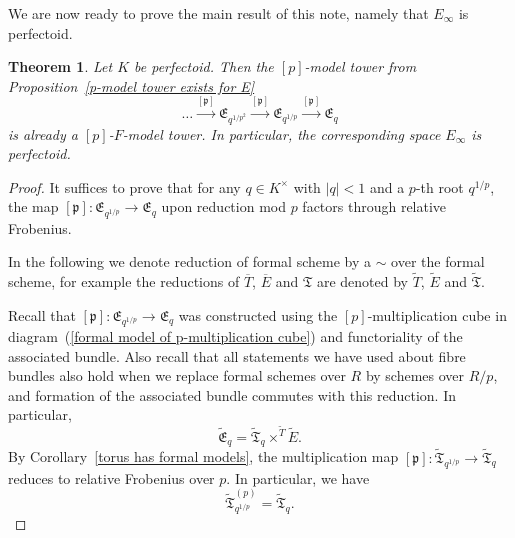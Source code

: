 \documentclass[11pt,oneside]{amsart}
\newtheorem{theorem}{Theorem}[section]
\theoremstyle{definition}
\theoremstyle{remark}
\begin{document}
	We are now ready to prove the main result of this note, namely that $E_\infty$ is perfectoid.
	\begin{framed}
	\begin{theorem}\label{p-F-model tower exists for E}
		Let $K$ be perfectoid. Then the $[p]$-model tower from Proposition~\ref{p-model tower exists for E}
		\[\dots \xrightarrow{[\mathfrak p]} \mathfrak E_{q^{1/p^2}}\xrightarrow{[\mathfrak p]} \mathfrak E_{q^{1/p}}\xrightarrow{[\mathfrak p]} \mathfrak E_q\]
		 is already a $[p]$-$F$-model tower.
		In particular, the corresponding space $E_\infty$ is perfectoid.
	\end{theorem}
	\end{framed}
	\begin{proof}
	
	It suffices to prove that for any $q\in K^\times$ with $|q|<1$ and a $p$-th root $q^{1/p}$, the map $[\mathfrak p]:\mathfrak E_{q^{1/p}}\xrightarrow{} \mathfrak E_q$ upon reduction mod $p$ factors through relative Frobenius.
	
	In the following we denote reduction of formal scheme by a $\sim$ over the formal scheme, for example the reductions of $\overline{T}$, $\overline{E}$ and $\mathfrak T$ are denoted by $\tilde{T}$, $\tilde{E}$ and $\tilde{\mathfrak{T}}$.
	
		
	Recall that $[\mathfrak p]:\mathfrak E_{q^{1/p}}\xrightarrow{} \mathfrak E_q$ was constructed using the $[p]$-multiplication cube in diagram~(\ref{formal model of p-multiplication cube}) and functoriality of the associated bundle. 	
	Also recall that all statements we have used about fibre bundles also hold when we replace formal schemes over $R$ by schemes over $R/p$, and formation of the associated bundle commutes with this reduction. In particular,
	\[\tilde{\mathfrak{E}}_q = \tilde{\mathfrak T}_q\times^{\tilde{T}}\tilde E.\]
	By  Corollary~\ref{torus has formal models}, the multiplication map $[\mathfrak p]:\tilde{\mathfrak T}_{q^{1/p}} \rightarrow \tilde{\mathfrak T}_{q}$ reduces to relative Frobenius over $p$. In particular, we have 
	\[\tilde{\mathfrak T}_{q^{1/p}}^{(p)} = \tilde{\mathfrak T}_{q}.\]
	

\end{proof}
\end{document}
